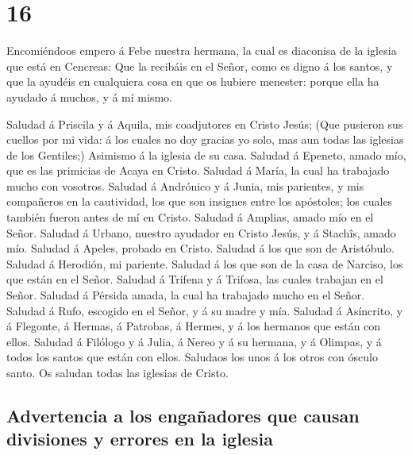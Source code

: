 \hypertarget{section-15}{%
\section{16}\label{section-15}}

 Encomiéndoos empero á Febe nuestra hermana, la cual es
diaconisa de la iglesia que está en Cencreas:  Que la
recibáis en el Señor, como es digno á los santos, y que la ayudéis en
cualquiera cosa en que os hubiere menester: porque ella ha ayudado á
muchos, y á mí mismo.

 Saludad á Priscila y á Aquila, mis coadjutores en Cristo
Jesús;  (Que pusieron sus cuellos por mi vida: á los cuales
no doy gracias yo solo, mas aun todas las iglesias de los Gentiles;)
 Asimismo á la iglesia de su casa. Saludad á Epeneto, amado
mío, que es las primicias de Acaya en Cristo.  Saludad á
María, la cual ha trabajado mucho con vosotros.  Saludad á
Andrónico y á Junia, mis parientes, y mis compañeros en la cautividad,
los que son insignes entre los apóstoles; los cuales también fueron
antes de mí en Cristo.  Saludad á Amplias, amado mío en el
Señor.  Saludad á Urbano, nuestro ayudador en Cristo Jesús,
y á Stachîs, amado mío.  Saludad á Apeles, probado en
Cristo. Saludad á los que son de Aristóbulo.  Saludad á
Herodión, mi pariente. Saludad á los que son de la casa de Narciso, los
que están en el Señor.  Saludad á Trifena y á Trifosa, las
cuales trabajan en el Señor. Saludad á Pérsida amada, la cual ha
trabajado mucho en el Señor.  Saludad á Rufo, escogido en
el Señor, y á su madre y mía.  Saludad á Asíncrito, y á
Flegonte, á Hermas, á Patrobas, á Hermes, y á los hermanos que están con
ellos.  Saludad á Filólogo y á Julia, á Nereo y á su
hermana, y á Olimpas, y á todos los santos que están con ellos.
 Saludaos los unos á los otros con ósculo santo. Os saludan
todas las iglesias de Cristo.

\hypertarget{advertencia-a-los-engauxf1adores-que-causan-divisiones-y-errores-en-la-iglesia}{%
\subsection{Advertencia a los engañadores que causan divisiones y
errores en la
iglesia}\label{advertencia-a-los-engauxf1adores-que-causan-divisiones-y-errores-en-la-iglesia}}

